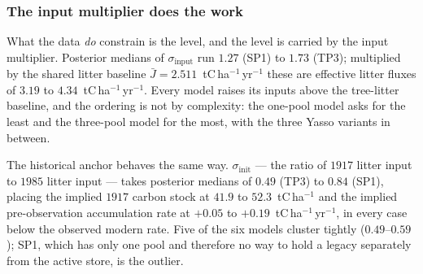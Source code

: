 \documentclass[11pt]{article}
\begin{document}
\subsubsection{The input multiplier does the work}
What the data \emph{do} constrain is the level, and the level is carried by the
input multiplier. Posterior medians of $\sigma_{\mathrm{input}}$ run $1.27$
(SP1) to $1.73$ (TP3); multiplied by the shared litter baseline $\bar J =
2.511$~tC\,ha$^{-1}$\,yr$^{-1}$ these are effective litter fluxes of $3.19$ to
$4.34$~tC\,ha$^{-1}$\,yr$^{-1}$. Every model raises its inputs above the
tree-litter baseline, and the ordering is not by complexity: the one-pool model
asks for the least and the three-pool model for the most, with the three Yasso
variants in between.

The historical anchor behaves the same way. $\sigma_{\mathrm{init}}$ --- the
ratio of $1917$ litter input to $1985$ litter input --- takes posterior medians
of $0.49$ (TP3) to $0.84$ (SP1), placing the implied $1917$ carbon stock at
$41.9$ to $52.3$~tC\,ha$^{-1}$ and the implied pre-observation accumulation rate
at $+0.05$ to $+0.19$~tC\,ha$^{-1}$\,yr$^{-1}$, in every case below the observed
modern rate. Five of the six models cluster tightly ($0.49$--$0.59$); SP1, which
has only one pool and therefore no way to hold a legacy separately from the
active store, is the outlier.
\end{document}
